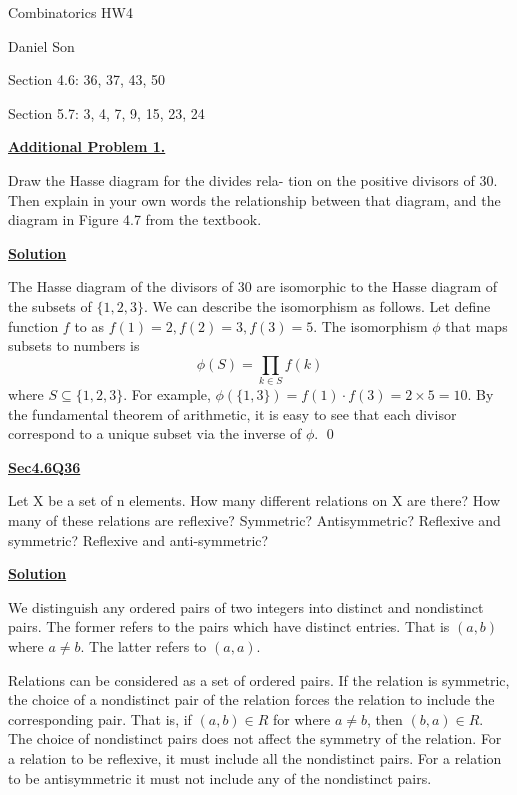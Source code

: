 \documentclass{article}
\newcommand{\new}[1]{
    \vspace{2mm}
    \noindent
    \textbf{
    \underline{#1}}
}
\newcommand{\m}{
    \cdot
}
\begin{document}
\begin{center}
\LARGE
Combinatorics HW4

\Large
Daniel Son
\end{center}


Section 4.6: 36, 37, 43, 50

Section 5.7: 3, 4, 7, 9, 15, 23, 24


\new{Additional Problem 1.}
 Draw the Hasse diagram for the divides rela-
tion on the positive divisors of 30. Then explain in your own words the
relationship between that diagram, and the diagram in Figure 4.7 from
the textbook.

\new{Solution}

\begin{center}
\end{center}

The Hasse diagram of the divisors of 30 are isomorphic to the 
Hasse diagram of the subsets of $\{1, 2, 3\}$. We can describe the 
isomorphism as follows. Let define function $f$ to as $f(1) = 2, 
f(2) = 3, f(3) = 5$. The isomorphism $\phi$ that maps subsets 
to numbers is
\[
    \phi(S) = \prod_{k \in S} f(k) 
\]
where $S \subseteq \{1,2, 3\}$. For example, 
$\phi(\{1, 3\}) = f(1)\m f(3) = 2\times 5 = 10$. By the 
fundamental theorem of arithmetic, it is easy to see that 
each divisor correspond to a unique subset via the inverse of 
$\phi$. \hfill \qed

\new{Sec4.6Q36} 
Let X be a set of n elements. How many different relations on X are there? How 
many of these relations are reflexive? Symmetric? Antisymmetric? Reflexive 
and symmetric? Reflexive and anti-symmetric?

\new{Solution}
We distinguish any ordered pairs of two integers into distinct 
and nondistinct pairs. The former refers to the pairs 
which have distinct entries. That is $(a, b)$ where $a \neq b$. 
The latter refers to $(a, a)$. 

Relations can be considered as a set of ordered pairs. If the 
relation is symmetric, the choice of a nondistinct pair of the 
relation forces the relation to include the corresponding pair. 
That is, if $(a, b) \in R$ for where $a \neq b$, then $(b, a) \in R$. 
The choice of nondistinct pairs does not affect the symmetry of 
the relation. For a relation to be reflexive, it must include 
all the nondistinct pairs. For a relation to be antisymmetric 
it must not include any of the nondistinct pairs. 
\end{document}

